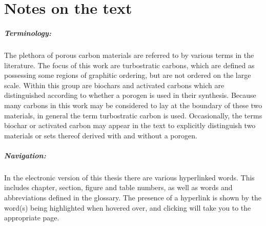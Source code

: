 \chapter*{Notes on the text}

\paragraph{Terminology:} The plethora of porous carbon materials are referred to by various terms in the literature. The focus of this work are \glspl{turbostratic carbon}, which are defined as possessing some regions of graphitic ordering, but are not ordered on the large scale. Within this group are \glspl{biochar} and \glspl{activated carbon} which are distinguished according to whether a \gls{porogen} is used in their synthesis. Because many carbons in this work may be considered to lay at the boundary of these two materials, in general the term \gls{turbostratic carbon} is used. Occasionally, the terms \gls{biochar} or \gls{activated carbon} may appear in the text to explicitly distinguish two materials or sets thereof derived with and without a \gls{porogen}.

\paragraph{Navigation:} In the electronic version of this thesis there are various hyperlinked words. This includes chapter, section, figure and table numbers, as well as words and abbreviations defined in the glossary. The presence of a hyperlink is shown by the word(s) being highlighted when hovered over, and clicking will take you to the appropriate page. 